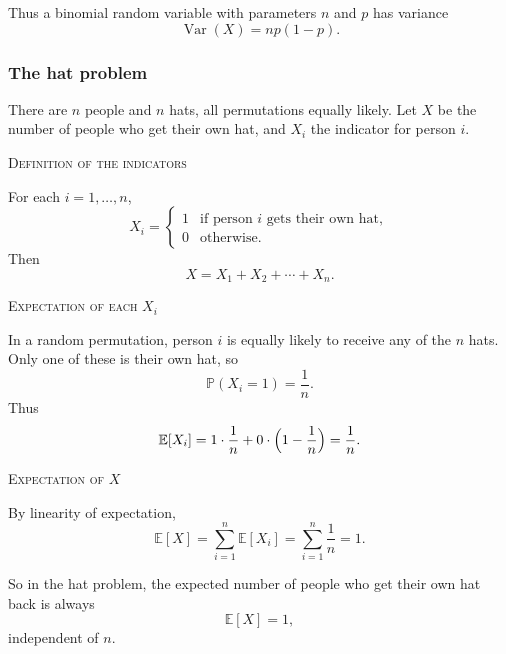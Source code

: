 Thus a binomial random variable with parameters \(n\) and \(p\) has variance
\[
\operatorname{Var}(X) = n p (1-p).
\]

\subsubsection{The hat problem}


There are \(n\) people and \(n\) hats, all permutations equally likely.  
Let \(X\) be the number of people who get their own hat, and \(X_i\) the indicator for person \(i\).

\bigskip\textsc{Definition of the indicators}

For each \(i = 1,\dots,n\),
\[
X_i =
\begin{cases}
1 & \text{if person } i \text{ gets their own hat},\\
0 & \text{otherwise}.
\end{cases}
\]
Then
\[
X = X_1 + X_2 + \cdots + X_n.
\]

\bigskip\textsc{Expectation of each \(X_i\)}

In a random permutation, person \(i\) is equally likely to receive any of the \(n\) hats.  
Only one of these is their own hat, so
\[
\mathbb{P}(X_i = 1) = \frac{1}{n}.
\]
Thus
\[
\mathbb{E}[X_i]
= 1 \cdot \frac{1}{n} + 0 \cdot \Bigl(1 - \frac{1}{n}\Bigr)
= \frac{1}{n}.
\]

\bigskip\textsc{Expectation of \(X\)}

By linearity of expectation,
\[
\mathbb{E}[X]
= \sum_{i=1}^{n} \mathbb{E}[X_i]
= \sum_{i=1}^{n} \frac{1}{n}
= 1.
\]

So in the hat problem, the expected number of people who get their own hat back is always
\[
\mathbb{E}[X] = 1,
\]
independent of \(n\).